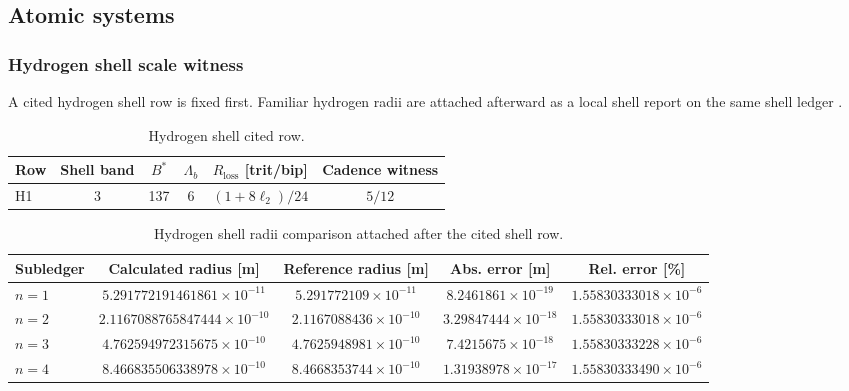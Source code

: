 \subsection{Atomic systems}

\subsubsection{Hydrogen shell scale witness}
\label{man:hydrogen-shell-scale-witness}

A cited hydrogen shell row is fixed first. Familiar hydrogen radii are attached afterward as a local shell report on the same shell ledger \cite{aod43_main_2026}.\par\smallskip
{}

\begin{table}[H]
\centering
\caption{Hydrogen shell cited row.}
\label{tab:hydrogen-shell-row}
\begin{threeparttable}
\small
\begin{tabularx}{\linewidth}{@{}lccccc@{}}
\toprule
Row & Shell band & $B^*$ & $\Lambda_b$ & $R_{\mathrm{loss}}$ [trit/bip] & Cadence witness \\
\midrule
H1 & 3 & 137 & 6 & $(1+8\ell_2)/24$ & $5/12$ \\
\bottomrule
\end{tabularx}
\end{threeparttable}
\end{table}

\begin{table}[H]
\centering
\caption{Hydrogen shell radii comparison attached after the cited shell row.}
\label{tab:hydrogen-shell-radii}
\begin{threeparttable}
\small
\begin{tabularx}{\linewidth}{@{}lcccc@{}}
\toprule
Subledger & Calculated radius [m] & Reference radius [m] & Abs. error [m] & Rel. error [\%] \\
\midrule
$n=1$ & $5.291772191461861\times10^{-11}$ & $5.291772109\times10^{-11}$ & $8.2461861\times10^{-19}$ & $1.55830333018\times10^{-6}$ \\
$n=2$ & $2.1167088765847444\times10^{-10}$ & $2.1167088436\times10^{-10}$ & $3.29847444\times10^{-18}$ & $1.55830333018\times10^{-6}$ \\
$n=3$ & $4.762594972315675\times10^{-10}$ & $4.7625948981\times10^{-10}$ & $7.4215675\times10^{-18}$ & $1.55830333228\times10^{-6}$ \\
$n=4$ & $8.466835506338978\times10^{-10}$ & $8.4668353744\times10^{-10}$ & $1.31938978\times10^{-17}$ & $1.55830333490\times10^{-6}$ \\
\bottomrule
\end{tabularx}
\end{threeparttable}
\end{table}

